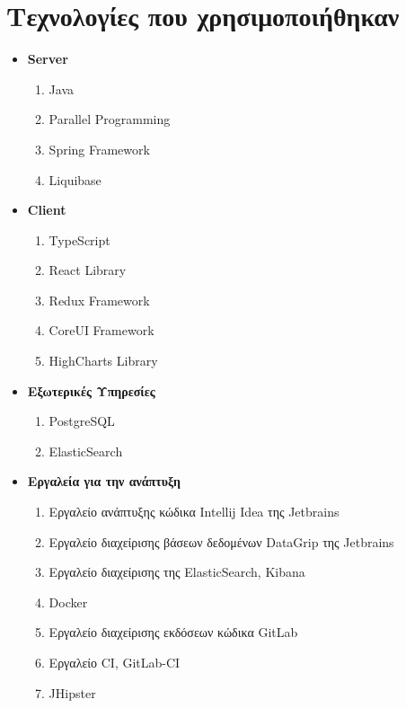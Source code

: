 \section{Τεχνολογίες που χρησιμοποιήθηκαν}
\begin{itemize}
    \item \textbf{Server}
    \begin{enumerate}
        \item Java
        \item Parallel Programming
        \item Spring Framework
        \item Liquibase
    \end{enumerate}
    \item \textbf{Client}
    \begin{enumerate}
        \item TypeScript
        \item React Library
        \item Redux Framework
        \item CoreUI Framework
        \item HighCharts Library
    \end{enumerate}
    \item \textbf{Εξωτερικές Υπηρεσίες}
    \begin{enumerate}
        \item PostgreSQL
        \item ElasticSearch
    \end{enumerate}
    \item \textbf{Εργαλεία για την ανάπτυξη}
    \begin{enumerate}
        \item Εργαλείο ανάπτυξης κώδικα Intellij Idea της Jetbrains
        \item Εργαλείο διαχείρισης βάσεων δεδομένων DataGrip της Jetbrains
        \item Εργαλείο διαχείρισης της ElasticSearch, Kibana
        \item Docker
        \item Εργαλείο διαχείρισης εκδόσεων κώδικα GitLab
        \item Εργαλείο CI, GitLab-CI
        \item JHipster
    \end{enumerate}
\end{itemize}